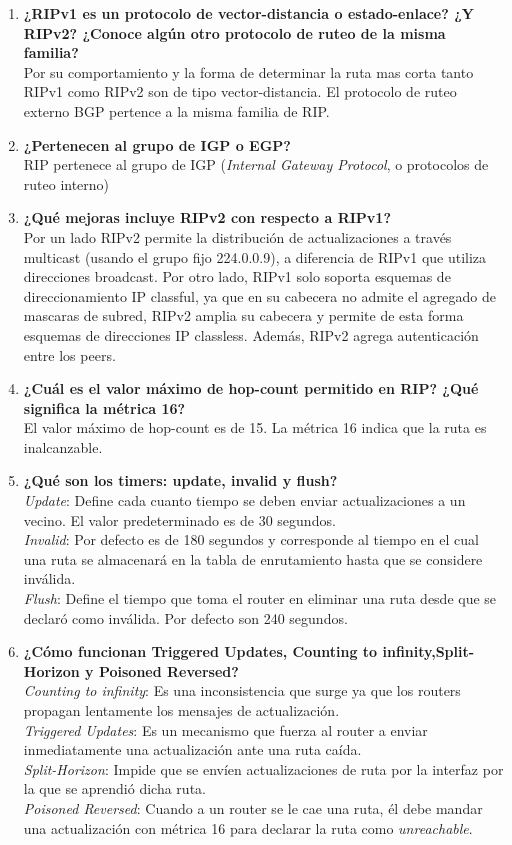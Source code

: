 \documentclass[letterpaper,12pt]{article}
\begin{document}
	\begin{enumerate}
		\item \textbf{¿RIPv1 es un protocolo de vector-distancia o estado-enlace? ¿Y RIPv2? ¿Conoce algún otro protocolo de ruteo de la misma familia?} \\
		Por su comportamiento y la forma de determinar la ruta mas corta tanto RIPv1 como RIPv2 son de tipo vector-distancia. El protocolo de ruteo externo BGP pertence a la misma familia de RIP.
		\item \textbf{¿Pertenecen al grupo de IGP o EGP?}\\
		RIP pertenece al grupo de IGP (\textit{Internal Gateway Protocol}, o protocolos de ruteo interno)
		\item \textbf{¿Qué mejoras incluye RIPv2 con respecto a RIPv1?}\\
		Por un lado RIPv2 permite la distribución de actualizaciones a través multicast (usando el grupo fijo 224.0.0.9), a diferencia de RIPv1 que utiliza direcciones broadcast. Por otro lado, RIPv1 solo soporta esquemas de direccionamiento IP classful, ya que en su cabecera no admite el agregado de mascaras de subred, RIPv2 amplia su cabecera y permite de esta forma esquemas de direcciones IP classless. Además, RIPv2 agrega autenticación entre los peers.
		\item \textbf{¿Cuál es el valor máximo de hop-count permitido en RIP? ¿Qué significa la métrica 16?}\\
		El valor máximo de hop-count es de 15. La métrica 16 indica que la ruta es inalcanzable.
		\item \textbf{ ¿Qué son los timers: update, invalid y flush?}\\
		\textit{Update}: Define cada cuanto tiempo se deben enviar actualizaciones a un vecino. El valor predeterminado es de 30 segundos.\\
		\textit{Invalid}: Por defecto es de 180 segundos y corresponde al tiempo en el cual una ruta se almacenará en la tabla de enrutamiento hasta que se considere inválida.\\
		\textit{Flush}: Define el tiempo que toma el router en eliminar una ruta desde que se declaró como inválida. Por defecto son 240 segundos.
		\item \textbf{¿Cómo funcionan Triggered Updates, Counting to infinity,Split-Horizon y Poisoned Reversed?}\\
		\textit{Counting to infinity}: Es una inconsistencia que surge ya que los routers propagan lentamente los mensajes de actualización.\\
		\textit{Triggered Updates}: Es un mecanismo que fuerza al router a enviar inmediatamente una actualización ante una ruta caída.\\
		\textit{Split-Horizon}: Impide que se envíen actualizaciones de ruta por la interfaz por la que se aprendió dicha ruta.\\
		\textit{Poisoned Reversed}: Cuando a un router se le cae una ruta, él debe mandar una actualización con métrica 16 para declarar la ruta como \textit{unreachable}.


\end{enumerate}
\end{document}
